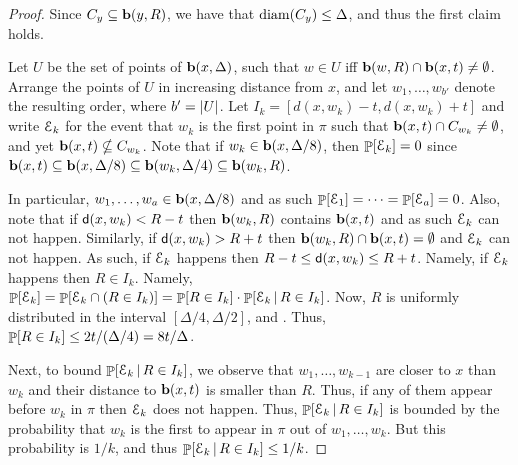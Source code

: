 \begin{proof}
    Since $C_y \subseteq \mathbf{b}(y, R)$, we have that $\mathrm{diam}(C_y) \leq
    \Delta$, and thus the first claim holds.
        
    Let $U$ be the set of points of $\mathbf{b}(x, \Delta)$, such that $w
    \in U$ iff $\mathbf{b}(w,R) \cap \mathbf{b}(x,t) \ne \emptyset$.  Arrange
    the points of $U$ in increasing distance from $x$, and let $w_1,
    \ldots, w_{b'}$ denote the resulting order, where $b'=
    \left| {U} \right|$.  Let $I_k = [d(x, w_k)-t, d(x,w_k)+t]$ and write
    $\EuScript{E}_k$ for the event that $w_k$ is the first point in $\pi$
    such that $\mathbf{b}(x,t) \cap C_{w_k} \neq \emptyset$, and yet
    $\mathbf{b}(x,t) \nsubseteq C_{w_k}$.  Note that if $w_k \in \mathbf{b}(x,
    \Delta/8)$, then $\Prob{\Event_k} = 0$ since $\mathbf{b}(x, t)
    \subseteq \mathbf{b}(x, \Delta/8) \subseteq \mathbf{b}(w_k, \Delta/4)
    \subseteq \mathbf{b}(w_k, R)$.
    
    In particular, $w_1, \ldots, w_a \in \mathbf{b}(x,\Delta/8)$ and as
    such $\Prob{ \Event_1} = \cdots = \Prob{ \Event_a} = 0$.  Also,
    note that if $\mathsf{d}(x, w_k)< R- t$ then $\mathbf{b}(w_k, R)$ contains
    $\mathbf{b}(x, t)$ and as such $\EuScript{E}_k$ can not happen. Similarly, if
    $\mathsf{d}(x, w_k) > R + t$ then $\mathbf{b}(w_k, R) \cap \mathbf{b}(x, t) =
    \emptyset$ and $\EuScript{E}_k$ can not happen. As such, if $\EuScript{E}_k$
    happens then $R-t \leq \mathsf{d}(x,w_k) \leq R+t$. Namely, if
    $\EuScript{E}_k$ happens then $R \in I_k$. Namely, $\Prob{ \Event_k } =
    \Prob{ \Event_k \cap (R \in I_k) } = \Prob{R \in I_k} \cdot \Prob{
       \Event_k\,|\,R \in I_k}$. Now, $R$ is uniformly distributed in
    the interval $[\Delta/4, \Delta/2]$, and . Thus, $\Prob{R \in I_k} \leq 2t/(\Delta/4) =
    8t/\Delta$.
    
    Next, to bound $\Prob{ \Event_k\,|\,R \in I_k}$, we observe that
    $w_1, \ldots, w_{k-1}$ are closer to $x$ than $w_k$ and their
    distance to $\mathbf{b}(x,t)$ is smaller than $R$. Thus, if any of them
    appear before $w_k$ in $\pi$ then $\EuScript{E}_k$ does not
    happen. Thus, $\Prob{ \Event_k\,|\,R \in I_k}$ is bounded by the
    probability that $w_k$ is the first to appear in $\pi$ out of
    $w_1, \ldots, w_k$. But this probability is $1/k$, and thus
    $\Prob{ \Event_k\,|\,R \in I_k} \leq 1/k$.
    

\end{proof}
